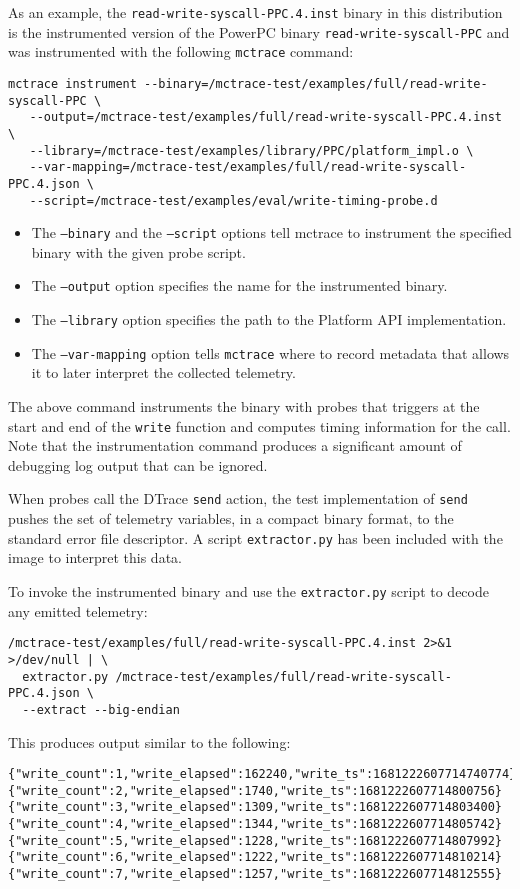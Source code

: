 As an example, the \texttt{read-write-syscall-PPC.4.inst} binary in this
distribution is the instrumented version of the PowerPC binary
\texttt{read-write-syscall-PPC} and was instrumented with the following
\texttt{mctrace} command:

\begin{verbatim}
mctrace instrument --binary=/mctrace-test/examples/full/read-write-syscall-PPC \
   --output=/mctrace-test/examples/full/read-write-syscall-PPC.4.inst \
   --library=/mctrace-test/examples/library/PPC/platform_impl.o \
   --var-mapping=/mctrace-test/examples/full/read-write-syscall-PPC.4.json \
   --script=/mctrace-test/examples/eval/write-timing-probe.d
\end{verbatim}

\begin{itemize}
\item The \texttt{--binary} and the \texttt{--script} options tell mctrace to instrument
  the specified binary with the given probe script.
\item The \texttt{--output} option specifies the name for the instrumented binary.
\item The \texttt{--library} option specifies the path to the Platform API
  implementation.
\item The \texttt{--var-mapping} option tells \texttt{mctrace} where to record metadata
  that allows it to later interpret the collected telemetry.
\end{itemize}

The above command instruments the binary with probes that triggers
at the start and end of the \texttt{write} function and computes timing
information for the call. Note that the instrumentation command produces
a significant amount of debugging log output that can be ignored.

When probes call the DTrace \texttt{send} action, the test
implementation of \texttt{send} pushes the set of telemetry variables,
in a compact binary format, to the standard error file descriptor.
A script \texttt{extractor.py} has been included with the image to
interpret this data.

To invoke the instrumented binary and use the \texttt{extractor.py} script to
decode any emitted telemetry:
\begin{verbatim}
/mctrace-test/examples/full/read-write-syscall-PPC.4.inst 2>&1
>/dev/null | \
  extractor.py /mctrace-test/examples/full/read-write-syscall-PPC.4.json \
  --extract --big-endian
\end{verbatim}
This produces output similar to the following:
\begin{verbatim}
{"write_count":1,"write_elapsed":162240,"write_ts":1681222607714740774} 
{"write_count":2,"write_elapsed":1740,"write_ts":1681222607714800756} 
{"write_count":3,"write_elapsed":1309,"write_ts":1681222607714803400} 
{"write_count":4,"write_elapsed":1344,"write_ts":1681222607714805742} 
{"write_count":5,"write_elapsed":1228,"write_ts":1681222607714807992} 
{"write_count":6,"write_elapsed":1222,"write_ts":1681222607714810214} 
{"write_count":7,"write_elapsed":1257,"write_ts":1681222607714812555} 
\end{verbatim}

